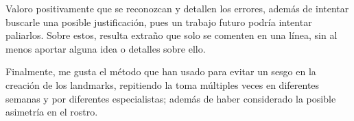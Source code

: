 \documentclass[13pt,a4paper]{article}
\begin{document}
Valoro positivamente que se reconozcan y detallen los errores, además de intentar buscarle una posible justificación, pues un trabajo futuro podría intentar paliarlos.
Sobre estos, resulta extraño que solo se comenten en una línea, sin al menos aportar alguna idea o detalles sobre ello.

\vspace{\baselineskip}

Finalmente, me gusta el método que han usado para evitar un sesgo en la creación de los landmarks, repitiendo la toma múltiples veces en diferentes semanas y por diferentes especialistas; además de haber considerado la posible asimetría en el rostro.


    \setlength{\parskip}{1em}
    \newpage
\end{document}
